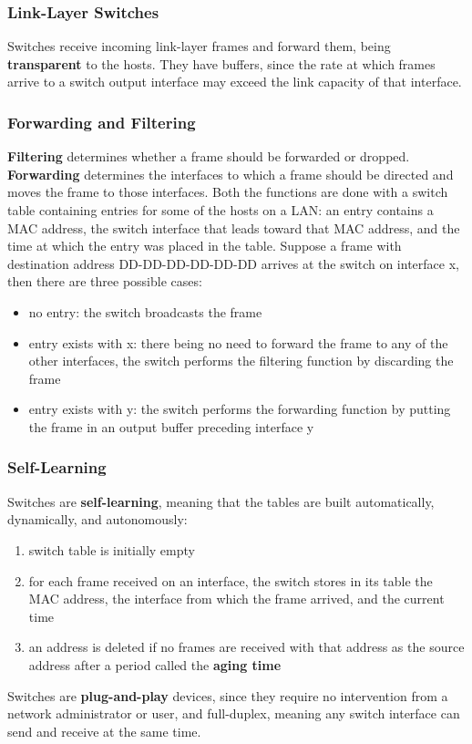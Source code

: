 \documentclass{article}
\begin{document}
\subsubsection{Link-Layer Switches}
Switches receive incoming link-layer frames and forward them, being \textbf{transparent} to the hosts.
They have buffers, since the rate at which frames arrive to a switch output interface may exceed the link capacity of that interface.
\subsubsection*{Forwarding and Filtering}
\textbf{Filtering} determines whether a frame should be forwarded or dropped.
\textbf{Forwarding} determines the interfaces to which a frame should be directed and moves the frame to those interfaces.
Both the functions are done with a switch table containing entries for some of the hosts on a LAN: an entry contains a MAC address, the switch interface that leads toward that MAC address, and the time at which the entry was placed in the table.
Suppose a frame with destination address DD-DD-DD-DD-DD-DD arrives at the switch on interface x, then there are three possible cases:
\begin{itemize}
    \item no entry: the switch broadcasts the frame 
    \item entry exists with x: there being no need to forward the frame to any of the other interfaces, the switch performs the filtering function by discarding the frame
    \item entry exists with y: the switch performs the forwarding function by putting the frame in an output buffer preceding interface y
\end{itemize}
\subsubsection*{Self-Learning}
Switches are \textbf{self-learning}, meaning that the tables are built automatically, dynamically, and autonomously:
\begin{enumerate}
    \item switch table is initially empty 
    \item for each frame received on an interface, the switch stores in its table the MAC address, the interface from which the frame arrived, and the current time
    \item an address is deleted if no frames are received with that address as the source address after a period called the \textbf{aging time}
\end{enumerate}
Switches are \textbf{plug-and-play} devices, since they require no intervention from a network administrator or user, and full-duplex, meaning any switch interface can send and receive at the same time.
\end{document}
